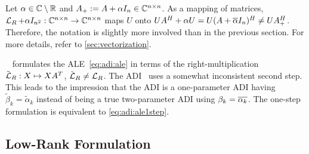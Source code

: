 \begin{remark}
  Let $\alpha\in\mathbb{C}\setminus\mathbb{R}$ and $A_+ := A+\alpha I_n \in\mathbb{C}^{n\times n}$.
  As a mapping of matrices,
  $\operatorname{\mathcal L}_R + \alpha I_{n^2} : \mathbb{C}^{n\times n} \to \mathbb{C}^{n\times n}$ maps $U$ onto
  $
    U A^\HT + \alpha U =
    U(A+\conj{\alpha} I_n)^\HT \neq
    U A_+^\HT
  $.
  Therefore, the notation is slightly more involved than in the previous section.
  For more details, refer to \autoref{sec:vectorization}.
\end{remark}

\begin{remark}
  \citeauthor{Lang2017}~\cite{Lang2017} formulates the \ac{ALE}~\eqref{eq:adi:ale} in terms of the
  right-multiplication $\tilde {\operatorname{\mathcal L}}_R :X \mapsto XA^T$, $\tilde {\operatorname{\mathcal L}}_R \neq \operatorname{\mathcal L}_R$.
  The ADI~\cite[Equation~(2.23)]{Lang2017} uses a somewhat inconsistent second step.
  This leads to the impression that the ADI is a one-parameter ADI having $\tilde\beta_k = \tilde\alpha_k$
  instead of being a true two-parameter ADI using $\beta_k = \conj{\alpha_k}$.
  The one-step formulation \cite[Equation~(2.24)]{Lang2017} is equivalent to \eqref{eq:adi:ale1step}.
\end{remark}

\subsection{Low-Rank Formulation}
\label{sec:adi:lr1step}

